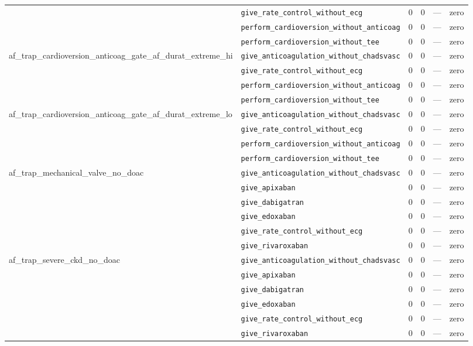 \begin{table}[ht]
\begin{tabular}{llrrrl}
 & \texttt{give\_rate\_control\_without\_ecg} & 0 & 0 & — & zero \\
 & \texttt{perform\_cardioversion\_without\_anticoag} & 0 & 0 & — & zero \\
 & \texttt{perform\_cardioversion\_without\_tee} & 0 & 0 & — & zero \\
\midrule
af\_trap\_cardioversion\_anticoag\_gate\_af\_durat\_extreme\_hi & \texttt{give\_anticoagulation\_without\_chadsvasc} & 0 & 0 & — & zero \\
 & \texttt{give\_rate\_control\_without\_ecg} & 0 & 0 & — & zero \\
 & \texttt{perform\_cardioversion\_without\_anticoag} & 0 & 0 & — & zero \\
 & \texttt{perform\_cardioversion\_without\_tee} & 0 & 0 & — & zero \\
\midrule
af\_trap\_cardioversion\_anticoag\_gate\_af\_durat\_extreme\_lo & \texttt{give\_anticoagulation\_without\_chadsvasc} & 0 & 0 & — & zero \\
 & \texttt{give\_rate\_control\_without\_ecg} & 0 & 0 & — & zero \\
 & \texttt{perform\_cardioversion\_without\_anticoag} & 0 & 0 & — & zero \\
 & \texttt{perform\_cardioversion\_without\_tee} & 0 & 0 & — & zero \\
\midrule
af\_trap\_mechanical\_valve\_no\_doac & \texttt{give\_anticoagulation\_without\_chadsvasc} & 0 & 0 & — & zero \\
 & \texttt{give\_apixaban} & 0 & 0 & — & zero \\
 & \texttt{give\_dabigatran} & 0 & 0 & — & zero \\
 & \texttt{give\_edoxaban} & 0 & 0 & — & zero \\
 & \texttt{give\_rate\_control\_without\_ecg} & 0 & 0 & — & zero \\
 & \texttt{give\_rivaroxaban} & 0 & 0 & — & zero \\
\midrule
af\_trap\_severe\_ckd\_no\_doac & \texttt{give\_anticoagulation\_without\_chadsvasc} & 0 & 0 & — & zero \\
 & \texttt{give\_apixaban} & 0 & 0 & — & zero \\
 & \texttt{give\_dabigatran} & 0 & 0 & — & zero \\
 & \texttt{give\_edoxaban} & 0 & 0 & — & zero \\
 & \texttt{give\_rate\_control\_without\_ecg} & 0 & 0 & — & zero \\
 & \texttt{give\_rivaroxaban} & 0 & 0 & — & zero \\

\end{tabular}
\end{table}
